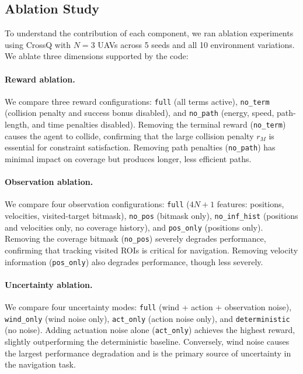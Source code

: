 \documentclass{article}
\begin{document}
\subsection{Ablation Study}
\label{sec:ablation}
To understand the contribution of each component, we ran ablation experiments using CrossQ with $N=3$ UAVs across 5 seeds and all 10 environment variations. We ablate three dimensions supported by the code:

\paragraph{Reward ablation.} We compare three reward configurations: \texttt{full} (all terms active), \texttt{no\_term} (collision penalty and success bonus disabled), and \texttt{no\_path} (energy, speed, path-length, and time penalties disabled). Removing the terminal reward (\texttt{no\_term}) causes the agent to collide, confirming that the large collision penalty $r_M$ is essential for constraint satisfaction. Removing path penalties (\texttt{no\_path}) has minimal impact on coverage but produces longer, less efficient paths.

\paragraph{Observation ablation.} We compare four observation configurations: \texttt{full} ($4N+1$ features: positions, velocities, visited-target bitmask), \texttt{no\_pos} (bitmask only), \texttt{no\_inf\_hist} (positions and velocities only, no coverage history), and \texttt{pos\_only} (positions only). Removing the coverage bitmask (\texttt{no\_pos}) severely degrades performance, confirming that tracking visited ROIs is critical for navigation. Removing velocity information (\texttt{pos\_only}) also degrades performance, though less severely.

\paragraph{Uncertainty ablation.} We compare four uncertainty modes: \texttt{full} (wind + action + observation noise), \texttt{wind\_only} (wind noise only), \texttt{act\_only} (action noise only), and \texttt{deterministic} (no noise). Adding actuation noise alone (\texttt{act\_only}) achieves the highest reward, slightly outperforming the deterministic baseline. Conversely, wind noise causes the largest performance degradation and is the primary source of uncertainty in the navigation task.
\end{document}
